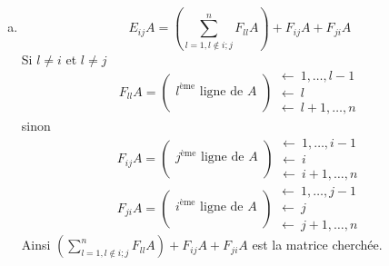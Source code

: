 {\begin{enumerate}[a)]
    \item $$E_{ij} A = \left( \sum_{l=1, l \notin {i; j}}^n F_{ll} A \right) + F_{ij} A + F_{ji} A$$
      Si $l\neq i$ et $l\neq j$ 
      $$F_{ll} A =
        \begin{pmatrix}
          \\ l^{\text{ème}} \text{ ligne de } A \\ \\
        \end{pmatrix} 
        \begin{array}{l} 
          \leftarrow ~ 1, \ldots, l-1 \\ \leftarrow ~ l \\ \leftarrow ~ l+1, \ldots, n 
        \end{array}$$
      sinon
        $$F_{ij} A =
        \begin{pmatrix}
          \\ j^{\text{ème}} \text{ ligne de } A \\ \\
        \end{pmatrix} 
        \begin{array}{l} 
          \leftarrow ~ 1, \ldots, i-1 \\ \leftarrow ~ i \\ \leftarrow ~ i+1, \ldots, n 
        \end{array}$$
        $$F_{ji} A =
        \begin{pmatrix}
          \\ i^{\text{ème}} \text{ ligne de } A \\ \\
        \end{pmatrix} 
        \begin{array}{l} 
          \leftarrow ~ 1, \ldots, j-1 \\ \leftarrow ~ j \\ \leftarrow ~ j+1, \ldots, n 
        \end{array}$$
      Ainsi $\left( \sum_{l=1, l \notin {i; j}}^{n} F_{ll} A \right) + F_{ij} A + F_{ji} A$ est la matrice cherchée.
  \end{enumerate}
}

